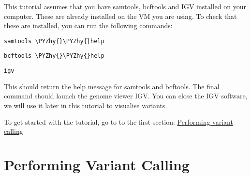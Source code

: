 \documentclass[11pt]{article}
\makeatletter
\def\PYZhy{\char`\-}
\newcommand{\boxspacing}{\kern\kvtcb@left@rule\kern\kvtcb@boxsep}
\newcommand{\prompt}[4]{

        {\ttfamily\llap{{\color{blue}\LARGE\faKeyboardO\hspace{3pt}#4}}\vspace{-\baselineskip}}
    }
\makeatother
\begin{document}
This tutorial assumes that you have samtools, bcftools and IGV installed
on your computer. These are already installed on the VM you are using.
To check that these are installed, you can run the following commands:

    \begin{tcolorbox}[breakable, size=fbox, boxrule=1pt, pad at break*=1mm,colback=cellbackground, colframe=cellborder]
\prompt{In}{incolor}{ }{\boxspacing}
\begin{Verbatim}[commandchars=\\\{\}]
samtools \PYZhy{}\PYZhy{}help
\end{Verbatim}
\end{tcolorbox}

    \begin{tcolorbox}[breakable, size=fbox, boxrule=1pt, pad at break*=1mm,colback=cellbackground, colframe=cellborder]
\prompt{In}{incolor}{ }{\boxspacing}
\begin{Verbatim}[commandchars=\\\{\}]
bcftools \PYZhy{}\PYZhy{}help
\end{Verbatim}
\end{tcolorbox}

    \begin{tcolorbox}[breakable, size=fbox, boxrule=1pt, pad at break*=1mm,colback=cellbackground, colframe=cellborder]
\prompt{In}{incolor}{ }{\boxspacing}
\begin{Verbatim}[commandchars=\\\{\}]
igv
\end{Verbatim}
\end{tcolorbox}

    This should return the help message for samtools and bcftools. The final
command should launch the genome viewer IGV. You can close the IGV
software, we will use it later in this tutorial to visualise variants.

To get started with the tutorial, go to to the first section:
\href{variant-calling.ipynb}{Performing variant calling}





\newpage





    \hypertarget{performing-variant-calling}{%
\section{Performing Variant Calling}\label{performing-variant-calling}}
\end{document}
